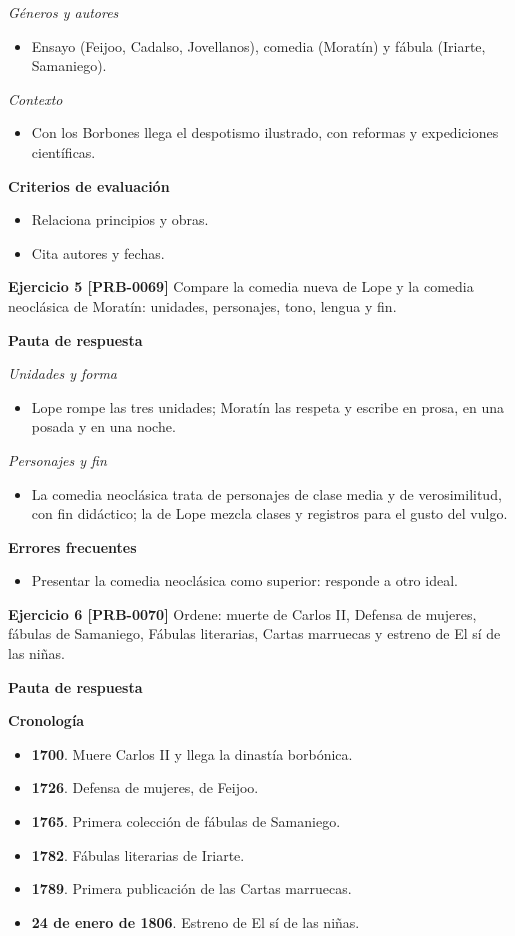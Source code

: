 \documentclass{book}
\begin{document}
\noindent\textit{Géneros y autores}
\begin{itemize}
\item Ensayo (Feijoo, Cadalso, Jovellanos), comedia (Moratín) y fábula (Iriarte, Samaniego).
\end{itemize}

\noindent\textit{Contexto}
\begin{itemize}
\item Con los Borbones llega el despotismo ilustrado, con reformas y expediciones científicas.
\end{itemize}

\noindent\textbf{Criterios de evaluación}
\begin{itemize}
\item Relaciona principios y obras.
\item Cita autores y fechas.
\end{itemize}

\noindent\textbf{Ejercicio 5 [PRB-0069]}
Compare la comedia nueva de Lope y la comedia neoclásica de Moratín: unidades, personajes, tono, lengua y fin.


\noindent\textbf{Pauta de respuesta}

\noindent\textit{Unidades y forma}
\begin{itemize}
\item Lope rompe las tres unidades; Moratín las respeta y escribe en prosa, en una posada y en una noche.
\end{itemize}

\noindent\textit{Personajes y fin}
\begin{itemize}
\item La comedia neoclásica trata de personajes de clase media y de verosimilitud, con fin didáctico; la de Lope mezcla clases y registros para el gusto del vulgo.
\end{itemize}

\noindent\textbf{Errores frecuentes}
\begin{itemize}
\item Presentar la comedia neoclásica como superior: responde a otro ideal.
\end{itemize}

\noindent\textbf{Ejercicio 6 [PRB-0070]}
Ordene: muerte de Carlos II, Defensa de mujeres, fábulas de Samaniego, Fábulas literarias, Cartas marruecas y estreno de El sí de las niñas.


\noindent\textbf{Pauta de respuesta}

\noindent\textbf{Cronología}
\begin{itemize}
\item \textbf{1700}. Muere Carlos II y llega la dinastía borbónica.
\item \textbf{1726}. Defensa de mujeres, de Feijoo.
\item \textbf{1765}. Primera colección de fábulas de Samaniego.
\item \textbf{1782}. Fábulas literarias de Iriarte.
\item \textbf{1789}. Primera publicación de las Cartas marruecas.
\item \textbf{24 de enero de 1806}. Estreno de El sí de las niñas.
\end{itemize}
\end{document}
